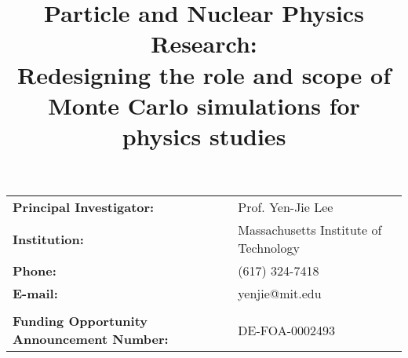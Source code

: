 \begin{titlepage}
\vspace{2.2 cm}
\title{\textbf{Particle and Nuclear Physics Research: \\
Redesigning the role and scope of Monte Carlo simulations for physics studies\\
}}

\vspace{.2 cm} 

\begin{center}
\begin{tabular}{ll}
 
\textbf{Principal Investigator:} & Prof. Yen-Jie Lee \\
\textbf{Institution:}                    & Massachusetts Institute of Technology \\
\textbf{Phone:} & 			(617) 324-7418 \\
\textbf{E-mail:} & 			yenjie@mit.edu \\
& \\
\textbf{Funding Opportunity Announcement Number:} & 	DE-FOA-0002493 \\

\end{tabular}
\end{center}



\end{titlepage}





